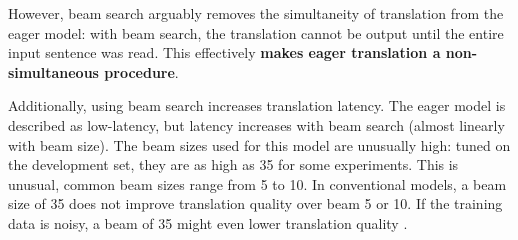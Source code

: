 \documentclass[english]{uzhpub}
\begin{document}
However, beam search arguably removes the simultaneity of translation from the eager model: with beam search, the translation cannot be output until the entire input sentence was read. This effectively \textbf{makes eager translation a non-simultaneous procedure}. 


Additionally, using beam search increases translation latency. The eager model is described as low-latency, but latency increases with beam search (almost linearly with beam size). The beam sizes used for this model are unusually high: tuned on the development set, they are as high as 35 for some experiments. This is unusual, common beam sizes range from 5 to 10. In conventional models, a beam size of 35 does not improve translation quality over beam 5 or 10. If the training data is noisy, a beam of 35 might even lower translation quality \cite{ott2018analyzing}.






\end{document}
